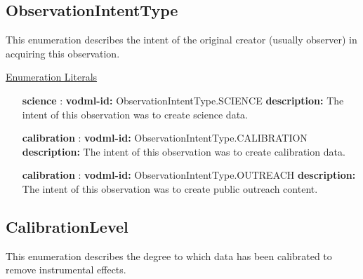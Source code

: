   \subsection{ObservationIntentType}
  \label{sect:ObservationIntentType}

  This enumeration describes the intent of the original creator (usually observer) in acquiring this observation.

  \noindent \underline{Enumeration Literals}
  \vspace{-\parsep}
  \small
  \begin{itemize}
  
    \item[\textbf{science}]: \textbf{vodml-id:} ObservationIntentType.SCIENCE \newline
          \textbf{description:} The intent of this observation was to create science data.
    \item[\textbf{calibration}]: \textbf{vodml-id:} ObservationIntentType.CALIBRATION \newline
          \textbf{description:} The intent of this observation was to create calibration data.
    \item[\textbf{calibration}]: \textbf{vodml-id:} ObservationIntentType.OUTREACH \newline
          \textbf{description:} The intent of this observation was to create public outreach content.
  \end{itemize}
  \normalsize


  \subsection{CalibrationLevel}
  \label{sect:CalibrationLevel}

  This enumeration describes the degree to which data has been calibrated to remove instrumental effects. 

